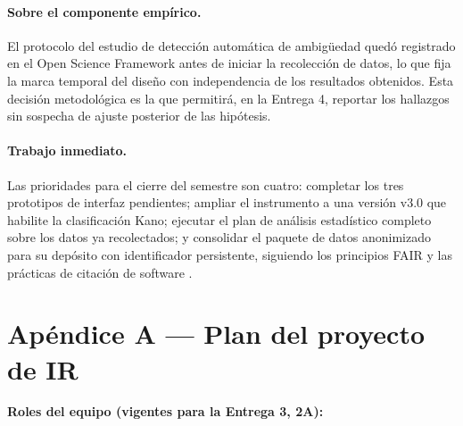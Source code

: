 \documentclass[journal,onecolumn]{IEEEtran}
\begin{document}
	\paragraph{Sobre el componente empírico.}
	El protocolo del estudio de detección automática de ambigüedad quedó
	registrado en el Open Science Framework antes de iniciar la recolección de
	datos, lo que fija la marca temporal del diseño con independencia de los
	resultados obtenidos. Esta decisión metodológica es la que permitirá, en la
	Entrega 4, reportar los hallazgos sin sospecha de ajuste posterior de las
	hipótesis.
	
	\paragraph{Trabajo inmediato.}
	Las prioridades para el cierre del semestre son cuatro: completar los tres
	prototipos de interfaz pendientes; ampliar el instrumento a una versión v3.0
	que habilite la clasificación Kano; ejecutar el plan de análisis estadístico
	completo sobre los datos ya recolectados; y consolidar el paquete de datos
	anonimizado para su depósito con identificador persistente, siguiendo los
	principios FAIR \cite{wilkinson2016} y las prácticas de citación de software
	\cite{smith2016}.
	
	\newpage
	\printbibliography[title={Referencias}]
	
	\newpage
	\appendix
	
	\section*{Apéndice A --- Plan del proyecto de IR}
	\label{ap:plan}
	
	\textbf{Roles del equipo (vigentes para la Entrega 3, 2A):}
	
\end{document}
